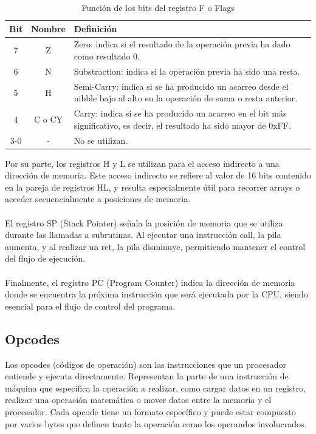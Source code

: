 \begin{table}[H]
    \centering
    \begin{tabular}{|c|c|>{\centering\arraybackslash}p{9cm}|}
        \hline
        \textbf{Bit} & \textbf{Nombre} & \textbf{Definición} \\
        \hline
        7 & Z & Zero: indica si el resultado de la operación previa ha dado como resultado 0. \\
        \hline
        6 & N & Substraction: indica si la operación previa ha sido una resta. \\
        \hline
        5 & H & Semi-Carry: indica si se ha producido un acarreo desde el nibble bajo al alto en la operación de suma o resta anterior. \\
        \hline
        4 & C o CY & Carry: indica si se ha producido un acarreo en el bit más significativo, es decir, el resultado ha sido mayor de 0xFF. \\
        \hline
        3-0 & - & No se utilizan. \\
        \hline
    \end{tabular}
    \caption{Función de los bits del registro F o Flags}
\end{table}

\clearpage

Por su parte, los registros H y L se utilizan para el acceso indirecto a una dirección de memoria. Este acceso indirecto se refiere al valor de 16 bits contenido en la pareja de registros HL, y resulta especialmente útil para recorrer arrays o acceder secuencialmente a posiciones de memoria.
\\\\
El registro SP (Stack Pointer) señala la posición de memoria que se utiliza durante las llamadas a subrutinas. Al ejecutar una instrucción call, la pila aumenta, y al realizar un ret, la pila disminuye, permitiendo mantener el control del flujo de ejecución.
\\\\
Finalmente, el registro PC (Program Counter) indica la dirección de memoria donde se encuentra la próxima instrucción que será ejecutada por la CPU, siendo esencial para el flujo de control del programa.

\subsection{Opcodes}

Los opcodes (códigos de operación) son las instrucciones que un procesador entiende y ejecuta directamente. Representan la parte de una instrucción de máquina que especifica la operación a realizar, como cargar datos en un registro, realizar una operación matemática o mover datos entre la memoria y el procesador. Cada opcode tiene un formato específico y puede estar compuesto por varios bytes que definen tanto la operación como los operandos involucrados.

